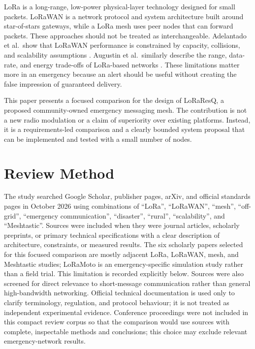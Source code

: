 \documentclass[journal]{IEEEtran}
\begin{document}
LoRa is a long-range, low-power physical-layer technology designed for small
packets. LoRaWAN is a network protocol and system architecture built around
star-of-stars gateways, while a LoRa mesh uses peer nodes that can forward
packets. These approaches should not be treated as interchangeable. Adelantado
et al.\ show that LoRaWAN performance is constrained by capacity, collisions,
and scalability assumptions \cite{adelantado2017}. Augustin et al.\ similarly
describe the range, data-rate, and energy trade-offs of LoRa-based networks
\cite{augustin2016}. These limitations matter more in an emergency because an
alert should be useful without creating the false impression of guaranteed
delivery.

This paper presents a focused comparison for the design of LoRaResQ, a
proposed community-owned emergency messaging mesh. The contribution is not a
new radio modulation or a claim of superiority over existing platforms.
Instead, it is a requirements-led comparison and a clearly bounded system
proposal that can be implemented and tested with a small number of nodes.

\section{Review Method}
The study searched Google Scholar, publisher pages, arXiv, and official
standards pages in October 2026 using combinations of ``LoRa'', ``LoRaWAN'',
``mesh'', ``off-grid'', ``emergency communication'', ``disaster'', ``rural'',
``scalability'', and ``Meshtastic''. Sources were included when they were
journal articles, scholarly preprints, or primary technical specifications
with a clear description of architecture, constraints, or measured results.
The six scholarly papers selected for this focused comparison are mostly
adjacent LoRa, LoRaWAN, mesh, and Meshtastic studies; LoRaMoto is an
emergency-specific simulation study rather than a field trial. This limitation
is recorded explicitly below. Sources were also
screened for direct relevance to short-message communication rather than
general high-bandwidth networking. Official technical documentation is used
only to clarify terminology, regulation, and protocol behaviour; it is not
treated as independent experimental evidence. Conference proceedings were not
included in this compact review corpus so that the comparison would use
sources with complete, inspectable methods and conclusions; this choice may
exclude relevant emergency-network results.
\end{document}
